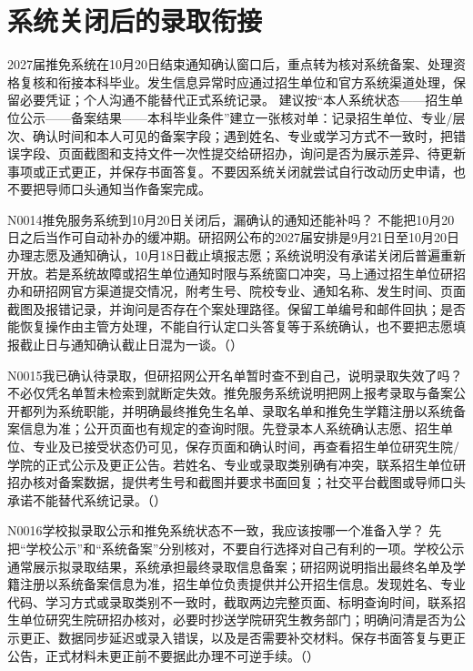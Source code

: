 
\section{系统关闭后的录取衔接}
2027届推免系统在10月20日结束通知确认窗口后，重点转为核对系统备案、处理资格复核和衔接本科毕业。发生信息异常时应通过招生单位和官方系统渠道处理，保留必要凭证；个人沟通不能替代正式系统记录。 建议按“本人系统状态——招生单位公示——备案结果——本科毕业条件”建立一张核对单：记录招生单位、专业/层次、确认时间和本人可见的备案字段；遇到姓名、专业或学习方式不一致时，把错误字段、页面截图和支持文件一次性提交给研招办，询问是否为展示差异、待更新事项或正式更正，并保存书面答复。不要因系统关闭就尝试自行改动历史申请，也不要把导师口头通知当作备案完成。
\begin{qa}{N0014}{推免服务系统到10月20日关闭后，漏确认的通知还能补吗？}
不能把10月20日之后当作可自动补办的缓冲期。研招网公布的2027届安排是9月21日至10月20日办理志愿及通知确认，10月18日截止填报志愿；系统说明没有承诺关闭后普遍重新开放。若是系统故障或招生单位通知时限与系统窗口冲突，马上通过招生单位研招办和研招网官方渠道提交情况，附考生号、院校专业、通知名称、发生时间、页面截图及报错记录，并询问是否存在个案处理路径。保留工单编号和邮件回执；是否能恢复操作由主管方处理，不能自行认定口头答复等于系统确认，也不要把志愿填报截止日与通知确认截止日混为一谈。（）
\end{qa}
\begin{qa}{N0015}{我已确认待录取，但研招网公开名单暂时查不到自己，说明录取失效了吗？}
不必仅凭名单暂未检索到就断定失效。推免服务系统说明把网上报考录取与备案公开都列为系统职能，并明确最终推免生名单、录取名单和推免生学籍注册以系统备案信息为准；公开页面也有规定的查询时限。先登录本人系统确认志愿、招生单位、专业及已接受状态仍可见，保存页面和确认时间，再查看招生单位研究生院/学院的正式公示及更正公告。若姓名、专业或录取类别确有冲突，联系招生单位研招办核对备案数据，提供考生号和截图并要求书面回复；社交平台截图或导师口头承诺不能替代系统记录。（）
\end{qa}
\begin{qa}{N0016}{学校拟录取公示和推免系统状态不一致，我应该按哪一个准备入学？}
先把“学校公示”和“系统备案”分别核对，不要自行选择对自己有利的一项。学校公示通常展示拟录取结果，系统承担最终录取信息备案；研招网说明指出最终名单及学籍注册以系统备案信息为准，招生单位负责提供并公开招生信息。发现姓名、专业代码、学习方式或录取类别不一致时，截取两边完整页面、标明查询时间，联系招生单位研究生院研招办核对，必要时抄送学院研究生教务部门；明确问清是否为公示更正、数据同步延迟或录入错误，以及是否需要补交材料。保存书面答复与更正公告，正式材料未更正前不要据此办理不可逆手续。（）
\end{qa}
